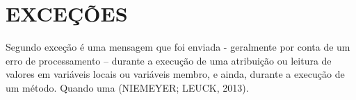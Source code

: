 \section{EXCEÇÕES}

Segundo  exceção é uma mensagem que foi enviada - geralmente por conta de um 
erro de processamento – durante a execução de uma atribuição ou leitura de 
valores em variáveis locais ou variáveis membro, e ainda, durante a execução 
de um método. 
Quando uma
(NIEMEYER; LEUCK, 2013).